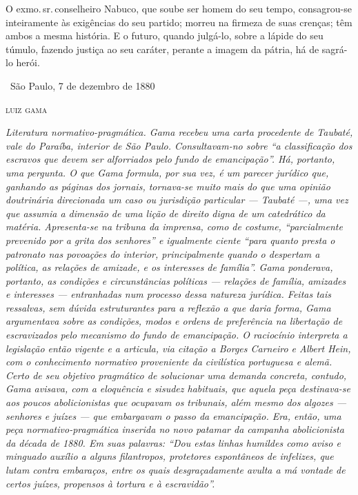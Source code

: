 {O exmo.\,sr.\,conselheiro Nabuco, que soube ser homem do seu tempo,
consagrou-se inteiramente às exigências do seu partido; morreu na
firmeza de suas crenças; têm ambos a mesma história. E o futuro, quando
julgá-lo, sobre a lápide do seu túmulo, fazendo justiça ao seu caráter,
perante a imagem da pátria, há de sagrá-lo herói.

\medskip

\hfill\ São Paulo, 7 de dezembro de 1880

\hfill\textsc{luiz gama}


\begin{resumo}
\emph{Literatura normativo-pragmática. Gama recebeu uma carta procedente
de Taubaté, vale do Paraíba, interior de São Paulo. Consultavam-no sobre
``a classificação dos escravos que devem ser alforriados pelo fundo de
emancipação''. Há, portanto, uma pergunta. O que Gama formula, por sua
vez, é um parecer jurídico que, ganhando as páginas dos jornais,
tornava-se muito mais do que uma opinião doutrinária direcionada um caso
ou jurisdição particular --- Taubaté ---, uma vez que assumia a dimensão
de uma lição de direito digna de um catedrático da matéria. Apresenta-se
na tribuna da imprensa, como de costume, ``parcialmente prevenido por a
grita dos senhores'' e igualmente ciente ``para quanto presta o patronato
nas povoações do interior, principalmente quando o despertam a política,
as relações de amizade, e os interesses de família''. Gama ponderava,
portanto, as condições e circunstâncias políticas --- relações de
família, amizades e interesses --- entranhadas num processo dessa
natureza jurídica. Feitas tais ressalvas, sem dúvida estruturantes para
a reflexão a que daria forma, Gama argumentava sobre as condições, modos
e ordens de preferência na libertação de escravizados pelo mecanismo do
fundo de emancipação. O raciocínio interpreta a legislação então vigente
e a articula, via citação a Borges Carneiro e Albert Hein, com o
conhecimento normativo proveniente da civilística portuguesa e alemã.
Certo de seu objetivo pragmático de solucionar uma demanda concreta,
contudo, Gama avisava, com a eloquência e sisudez habituais, que aquela
peça destinava-se aos poucos abolicionistas que ocupavam os tribunais,
além mesmo dos algozes --- senhores e juízes --- que embargavam o passo da
emancipação. Era, então, uma peça normativo-pragmática inserida no novo
patamar da campanha abolicionista da década de 1880. Em suas palavras:
``Dou estas linhas humildes como aviso e minguado auxílio a alguns
filantropos, protetores espontâneos de infelizes, que lutam contra
embaraços, entre os quais desgraçadamente avulta a má vontade de certos
juízes, propensos à tortura e à escravidão''.}
\end{resumo}

}
